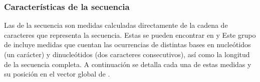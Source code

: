 %
%
\subsubsection{Características de la secuencia}
%
Las  de la secuencia son medidas calculadas directamente de
la cadena de caracteres que representa la secuencia.  Estas 
se pueden encontrar en \cite{ng} y \cite{batuwita} Este grupo
de  incluye medidas que cuentan las ocurrencias de distintas
bases en nucleótidos (un carácter) y dinucleótidos (dos caracteres
consecutivos), así como la longitud de la secuencia completa. A
continuación se detalla cada una de estas medidas y su posición en el
vector global de .
